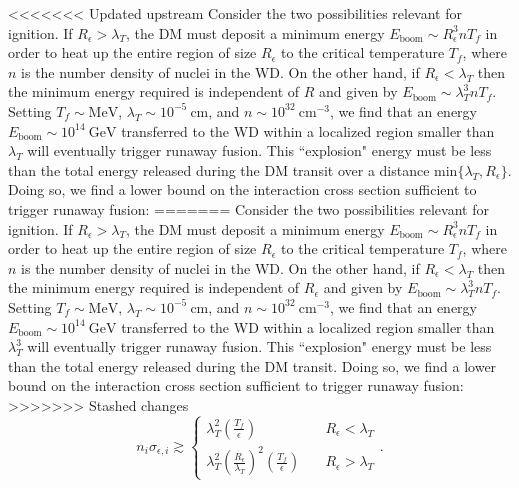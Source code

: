 \documentclass[11 pt,preprint,preprintnumbers,amsmath,amssymb, prd]{revtex4}
\def\r{\right)}
\def\l{\left(}
\begin{document}
<<<<<<< Updated upstream
Consider the two possibilities relevant for ignition. If $R_\epsilon> \lambda_T$, the DM must deposit a minimum energy $E_{\text{boom}} \sim R_\epsilon^3 n T_f$ in order to heat up the entire region of size $R_\epsilon$ to the critical temperature $T_f$, where $n$ is the number density of nuclei in the WD. On the other hand, if $R_\epsilon < \lambda_T$ then the minimum energy required is independent of $R$ and given by $E_{\text{boom}} \sim \lambda_T^3 n T_f$. Setting $T_f \sim \text{MeV}$, $\lambda_T \sim 10^{-5} ~\text{cm}$, and $n \sim 10^{32} ~\text{cm}^{-3}$, we find that an energy $E_{\text{boom}} \sim 10^{14} ~\text{GeV}$ transferred to the WD within a localized region smaller than $\lambda_T$ will eventually trigger runaway fusion. This ``explosion" energy must be less than the total energy released during the DM transit over a distance $\text{min}\{\lambda_T, R_\epsilon\}$. Doing so, we find a lower bound on the interaction cross section sufficient to trigger runaway fusion:
=======
Consider the two possibilities relevant for ignition. If $R_\epsilon> \lambda_T$, the DM must deposit a minimum energy $E_{\text{boom}} \sim R_\epsilon^3 n T_f$ in order to heat up the entire region of size $R_\epsilon$ to the critical temperature $T_f$, where $n$ is the number density of nuclei in the WD. On the other hand, if $R_\epsilon < \lambda_T$ then the minimum energy required is independent of $R_\epsilon$ and given by $E_{\text{boom}} \sim \lambda_T^3 n T_f$. Setting $T_f \sim \text{MeV}$, $\lambda_T \sim 10^{-5} ~\text{cm}$, and $n \sim 10^{32} ~\text{cm}^{-3}$, we find that an energy $E_{\text{boom}} \sim 10^{14} ~\text{GeV}$ transferred to the WD within a localized region smaller than $\lambda_T^3$ will eventually trigger runaway fusion. This ``explosion" energy must be less than the total energy released during the DM transit. Doing so, we find a lower bound on the interaction cross section sufficient to trigger runaway fusion: 
>>>>>>> Stashed changes
\begin{equation}
\label{eq:explosion}
n_i \sigma_{\epsilon,i} \gtrsim \left\{
        \begin{array}{ll}
            \displaystyle \lambda_T^2 \l \frac{T_f}{\epsilon} \r & \quad R_\epsilon < \lambda_T \\
             \lambda_T^2 \l \frac{R_\epsilon}{\lambda_T}\r^2 \l \frac{T_f}{\epsilon} \r & \quad R_\epsilon > \lambda_T
        \end{array}
    \right..
\end{equation}
\end{document}

